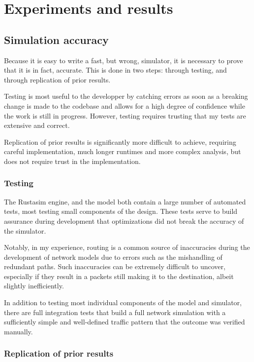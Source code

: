 \chapter{Experiments and results} \label{results}

\section{Simulation accuracy} \label{accuracy}

Because it is easy to write a fast, but wrong, simulator, it is necessary to prove that it is in fact, accurate.
This is done in two steps: through testing, and through replication of prior results.

Testing is most useful to the developper by catching errors as soon as a breaking change is made to the codebase and allows for a high degree of confidence while the work is still in progress.
However, testing requires trusting that my tests are extensive and correct.

Replication of prior results is significantly more difficult to achieve, requiring careful implementation, much longer runtimes and more complex analysis, but does not require trust in the implementation.

\subsection{Testing} \label{testing}

The Rustasim engine, and the \datacenter model both contain a large number of automated tests, most testing small components of the design.
These tests serve to build assurance during development that optimizations did not break the accuracy of the simulator.

Notably, in my experience, routing is a common source of inaccuracies during the development of network models due to errors such as the mishandling of redundant paths.
Such inaccuracies can be extremely difficult to uncover, especially if they result in a packets still making it to the destination, albeit slightly inefficiently.

In addition to testing most individual components of the model and simulator, there are full integration tests that build a full network simulation with a sufficiently simple and well-defined traffic pattern that the outcome was verified manually.

\subsection{Replication of prior results} \label{replication}

